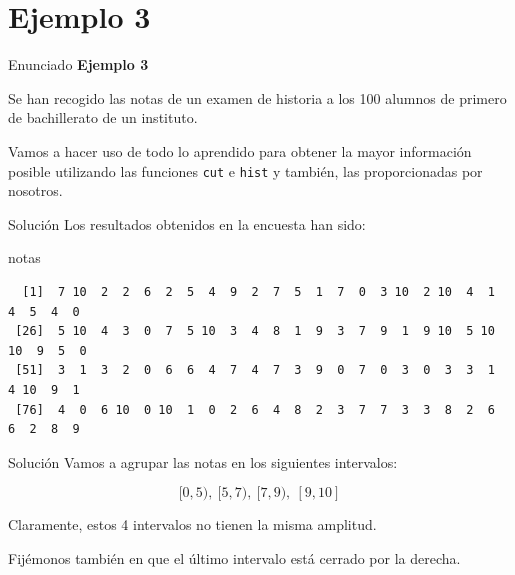 \documentclass[
  ignorenonframetext,
]{beamer}
\newenvironment{Shaded}{\begin{snugshade}}{\end{snugshade}}
\newcommand{\NormalTok}[1]{#1}
\begin{document}
\section{Ejemplo 3}\label{ejemplo-3-14}

\begin{frame}[fragile]{Enunciado}
\label{enunciado-2}
\textbf{Ejemplo 3}

Se han recogido las notas de un examen de historia a los 100 alumnos de
primero de bachillerato de un instituto.

Vamos a hacer uso de todo lo aprendido para obtener la mayor información
posible utilizando las funciones \texttt{cut} e \texttt{hist} y también,
las proporcionadas por nosotros.
\end{frame}

\begin{frame}[fragile]{Solución}
\label{soluciuxf3n-15}
Los resultados obtenidos en la encuesta han sido:

\begin{Shaded}
\begin{Highlighting}[]
\NormalTok{notas}
\end{Highlighting}
\end{Shaded}

\begin{verbatim}
  [1]  7 10  2  2  6  2  5  4  9  2  7  5  1  7  0  3 10  2 10  4  1  4  5  4  0
 [26]  5 10  4  3  0  7  5 10  3  4  8  1  9  3  7  9  1  9 10  5 10 10  9  5  0
 [51]  3  1  3  2  0  6  6  4  7  4  7  3  9  0  7  0  3  0  3  3  1  4 10  9  1
 [76]  4  0  6 10  0 10  1  0  2  6  4  8  2  3  7  7  3  3  8  2  6  6  2  8  9
\end{verbatim}
\end{frame}

\begin{frame}{Solución}
\label{soluciuxf3n-16}
Vamos a agrupar las notas en los siguientes intervalos:

\[[0,5),\ [5,7),\ [7,9),\ [9,10]\]

Claramente, estos 4 intervalos no tienen la misma amplitud.

Fijémonos también en que el último intervalo está cerrado por la
derecha.
\end{frame}
\end{document}
